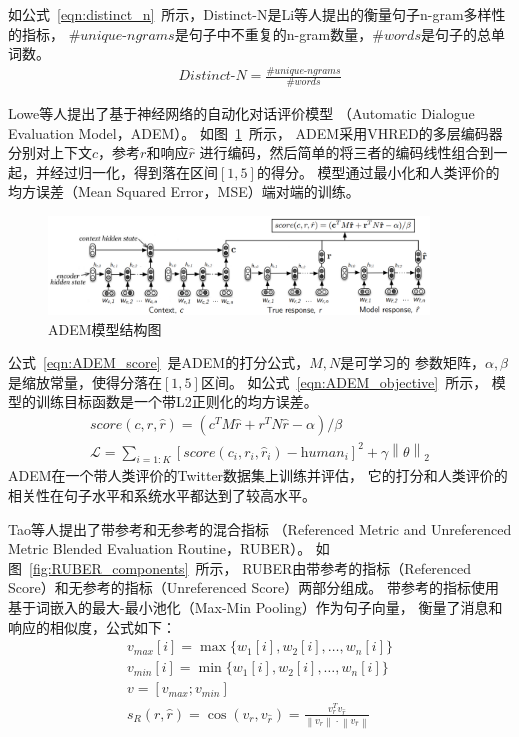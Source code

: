 如公式~\ref{eqn:distinct_n}~所示，Distinct-N是Li等人提出的衡量句子n-gram多样性的指标，
$\#\textit{unique-ngrams}$是句子中不重复的n-gram数量，$\#\textit{words}$是句子的总单词数。
\begin{align}
    \textit{Distinct-N} = \frac{\#\textit{unique-ngrams}}{\#\textit{words}}
    \label{eqn:distinct_n}
\end{align}

Lowe等人提出了基于神经网络的自动化对话评价模型
（Automatic Dialogue Evaluation Model，ADEM）。
如图~\ref{fig:ADEM_model}~所示，
ADEM采用VHRED的多层编码器分别对上下文$c$，参考$r$和响应$\hat{r}$
进行编码，然后简单的将三者的编码线性组合到一起，并经过归一化，得到落在区间$[1, 5]$的得分。
模型通过最小化和人类评价的均方误差（Mean Squared Error，MSE）端对端的训练。
\begin{figure}[H]
    \centering
    \includegraphics[width=0.9\textwidth]{figure/ADEM.pdf}
    \caption{ADEM模型结构图}
    \label{fig:ADEM_model}
\end{figure}

公式~\ref{eqn:ADEM_score}~是ADEM的打分公式，$M, N$是可学习的
参数矩阵，$\alpha, \beta$是缩放常量，使得分落在$[1, 5]$区间。
如公式~\ref{eqn:ADEM_objective}~所示，
模型的训练目标函数是一个带L2正则化的均方误差。
\begin{align}
    \textit{score}(c, r, \hat{r}) = (c^T M \hat{r} + r^T N \hat{r} - \alpha) / \beta
    \label{eqn:ADEM_score} \\
    \mathcal{L} = \sum_{i=1:K} [\textit{score}(c_i, r_i, \hat{r}_i) - \textit{human}_i]^2 + \gamma \left\| \theta \right\| _2
    \label{eqn:ADEM_objective}
\end{align}
ADEM在一个带人类评价的Twitter数据集上训练并评估，
它的打分和人类评价的相关性在句子水平和系统水平都达到了较高水平。

Tao等人提出了带参考和无参考的混合指标
（Referenced Metric and Unreferenced Metric Blended Evaluation Routine，RUBER）。
如图~\ref{fig:RUBER_components}~所示，
RUBER由带参考的指标（Referenced Score）和无参考的指标（Unreferenced Score）两部分组成。
带参考的指标使用
基于词嵌入的最大-最小池化（Max-Min Pooling）作为句子向量，
衡量了消息和响应的相似度，公式如下：
\begin{align}
    v_{max}[i] = \max \{ w_1[i], w_2[i], \dots, w_n[i] \} \\
    v_{min}[i] = \min \{ w_1[i], w_2[i], \dots, w_n[i] \} \\
    v = [v_{max}; v_{min}] \\
    s_R(r, \hat{r}) = \cos(v_r, v_{\hat{r}}) =
    \frac{v_r^T v_{\hat{r}}}{\left\| v_r \right\| \cdot \left\| v_{\hat{r}} \right\|}
\end{align}

